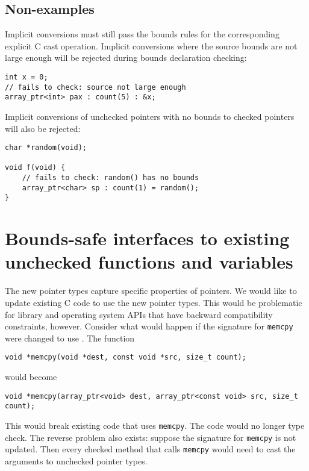 \subsection{Non-examples}

Implicit conversions must still pass the bounds rules for the corresponding explicit
C cast operation.  Implicit conversions where the source bounds are not large
enough will be rejected during bounds declaration checking:
\begin{verbatim}
int x = 0;
// fails to check: source not large enough
array_ptr<int> pax : count(5) : &x;
\end{verbatim}

Implicit conversions of unchecked pointers with no bounds to checked pointers
will also be rejected:
\begin{verbatim}
char *random(void);

void f(void) {
    // fails to check: random() has no bounds
    array_ptr<char> sp : count(1) = random(); 
}
\end{verbatim}

\section{Bounds-safe interfaces to existing unchecked functions and variables}
\label{section:function-bounds-safe-interfaces}

The new pointer types capture specific properties of pointers. We would like to update
existing C code to use the new pointer types. This would be problematic for library and operating
system APIs that have backward  compatibility constraints, however.   Consider what would happen
if the signature for \texttt{memcpy} were changed to use \arrayptr. The function

\begin{verbatim}
void *memcpy(void *dest, const void *src, size_t count);
\end{verbatim}

would become

\begin{verbatim}
void *memcpy(array_ptr<void> dest, array_ptr<const void> src, size_t count);
\end{verbatim}

This would break existing code that uses \texttt{memcpy}.  The code would no
longer type check.  The reverse problem also exists: suppose the signature for
\texttt{memcpy} is not updated.  Then every checked method that calls
\texttt{memcpy} would need to cast the arguments to unchecked pointer types.

